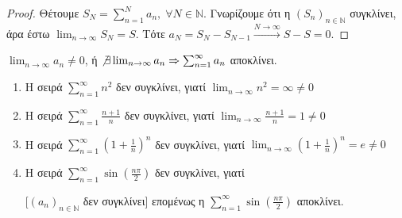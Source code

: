 \documentclass[main.tex]{subfiles}
\begin{document}

\begin{proof}
\item {}
    Θέτουμε $ S_{N} = \sum_{n=1}^{N} a_{n}, \; \forall N \in \mathbb{N} $. Γνωρίζουμε 
    ότι η $ {(S_{n})}_{n \in \mathbb{N}} $ συγκλίνει, άρα έστω 
    $ \lim_{n \to \infty} S_{N} = S$.
    Τότε $ a_{N} = S_{N}-S_{N-1} \xrightarrow{N \to \infty} S-S = 0 $.
\end{proof}

\begin{cor}[Αντιθετοαντίστροφο]
    $ \lim_{n \to \infty} a_{n} \neq 0 $, ή $ \not \exists \lim_{n \to \infty} a_{n} 
    \Rightarrow \sum_{n=1}^{\infty} a_{n} $ αποκλίνει.
\end{cor}

\begin{examples}
    \begin{enumerate}
        \item Η σειρά $ \sum_{n=1}^{\infty} n^{2} $ δεν συγκλίνει, γιατί 
            $ \lim_{n \to \infty} n^{2} = \infty \neq 0$
        \item Η σειρά $ \sum_{n=1}^{\infty} \frac{n+1}{n} $ δεν συγκλίνει, γιατί 
            $ \lim_{n \to \infty} \frac{n+1}{n} = 1 \neq 0 $
        \item Η σειρά $ \sum_{n=1}^{\infty} (1 + \frac{1}{n} )^{n} $ δεν συγκλίνει, 
            γιατί $ \lim_{n \to \infty} (1+ \frac{1}{n} )^{n} = e \neq 0 $
        \item Η σειρά $ \sum_{n=1}^{\infty} \sin{\left(\frac{n \pi}{2}\right)} $ 
            δεν συγκλίνει, γιατί 

            \begin{minipage}{0.55\textwidth}
            \end{minipage}

            [$ {(a_{n})}_{n \in \mathbb{N}} $ δεν συγκλίνει]
            επομένως η $ \sum_{n=1}^{\infty} \sin{\left(\frac{n \pi}{2}\right) } $ 
            αποκλίνει.
    \end{enumerate}
\end{examples}
\end{document}
